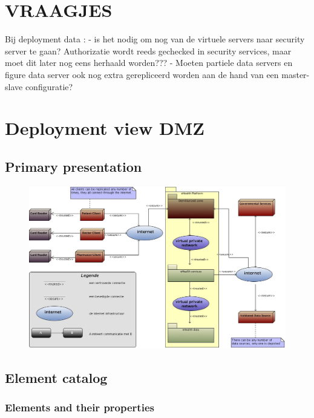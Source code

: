 \documentclass[a4paper,10pt]{paper}
\begin{document}
\section{VRAAGJES}

Bij deployment data : 
	- is het nodig om nog van de virtuele servers naar security server te gaan?
 	  Authorizatie wordt reeds gechecked in security services, maar moet dit later
	  nog eens herhaald worden???
	- Moeten partiele data servers en figure data server ook nog extra gerepliceerd
	  worden aan de hand van een master-slave configuratie?


\section{Deployment view DMZ}

\subsection{Primary presentation}
\begin{center}
    \begin{figure}
      \includegraphics[width=\textwidth]{../images/deployment_DMZ.jpg}
    \end{figure}
  \end{center}

\subsection{Element catalog}

\subsubsection{Elements and their properties}
\end{document}
